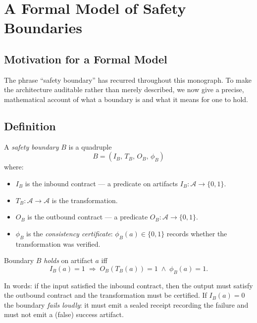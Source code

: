 \chapter{A Formal Model of Safety Boundaries}
\label{ch:formal}

\section{Motivation for a Formal Model}
\label{sec:formal-mot}

The phrase ``safety boundary'' has recurred throughout this monograph. To make
the architecture auditable rather than merely described, we now give a
precise, mathematical account of what a boundary is and what it means for one
to hold.

\section{Definition}
\label{sec:formal-def}

\begin{definition}
A \emph{safety boundary} $B$ is a quadruple
\[
B = (I_B,\, T_B,\, O_B,\, \phi_B)
\]
where:
\begin{itemize}
  \item $I_B$ is the inbound contract --- a predicate on artifacts
        $I_B : \mathcal{A} \to \{0,1\}$.
  \item $T_B : \mathcal{A} \to \mathcal{A}$ is the transformation.
  \item $O_B$ is the outbound contract --- a predicate
        $O_B : \mathcal{A} \to \{0,1\}$.
  \item $\phi_B$ is the \emph{consistency certificate}:
        $\phi_B(a) \in \{0,1\}$ records whether the transformation was
        verified.
\end{itemize}
\end{definition}

\begin{definition}
Boundary $B$ \emph{holds} on artifact $a$ iff
\[
I_B(a) = 1 \;\Longrightarrow\; O_B(T_B(a)) = 1 \;\wedge\; \phi_B(a) = 1.
\]
\end{definition}

In words: if the input satisfied the inbound contract, then the output must
satisfy the outbound contract and the transformation must be certified. If
$I_B(a) = 0$ the boundary \emph{fails loudly}: it must emit a sealed receipt
recording the failure and must not emit a (false) success artifact.

